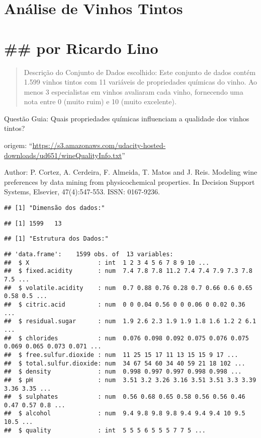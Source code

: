 \documentclass[]{article}
\title{}
\author{}
\date{}
\begin{document}
\hypertarget{analise-de-vinhos-tintos}{%
\section{Análise de Vinhos Tintos}\label{analise-de-vinhos-tintos}}

\hypertarget{por-ricardo-lino}{%
\section{\#\# por Ricardo Lino}\label{por-ricardo-lino}}

\begin{quote}
Descrição do Conjunto de Dados escolhido: Este conjunto de dados contém
1.599 vinhos tintos com 11 variáveis de propriedades químicas do vinho.
Ao menos 3 especialistas em vinhos avaliaram cada vinho, fornecendo uma
nota entre 0 (muito ruim) e 10 (muito excelente).
\end{quote}

Questão Guia: Quais propriedades químicas influenciam a qualidade dos
vinhos tintos?

origem:
``\url{https://s3.amazonaws.com/udacity-hosted-downloads/ud651/wineQualityInfo.txt}''

Author: P. Cortez, A. Cerdeira, F. Almeida, T. Matos and J. Reis.
Modeling wine preferences by data mining from physicochemical
properties. In Decision Support Systems, Elsevier, 47(4):547-553. ISSN:
0167-9236.

\begin{verbatim}
## [1] "Dimensão dos dados:"
\end{verbatim}

\begin{verbatim}
## [1] 1599   13
\end{verbatim}

\begin{verbatim}
## [1] "Estrutura dos Dados:"
\end{verbatim}

\begin{verbatim}
## 'data.frame':    1599 obs. of  13 variables:
##  $ X                   : int  1 2 3 4 5 6 7 8 9 10 ...
##  $ fixed.acidity       : num  7.4 7.8 7.8 11.2 7.4 7.4 7.9 7.3 7.8 7.5 ...
##  $ volatile.acidity    : num  0.7 0.88 0.76 0.28 0.7 0.66 0.6 0.65 0.58 0.5 ...
##  $ citric.acid         : num  0 0 0.04 0.56 0 0 0.06 0 0.02 0.36 ...
##  $ residual.sugar      : num  1.9 2.6 2.3 1.9 1.9 1.8 1.6 1.2 2 6.1 ...
##  $ chlorides           : num  0.076 0.098 0.092 0.075 0.076 0.075 0.069 0.065 0.073 0.071 ...
##  $ free.sulfur.dioxide : num  11 25 15 17 11 13 15 15 9 17 ...
##  $ total.sulfur.dioxide: num  34 67 54 60 34 40 59 21 18 102 ...
##  $ density             : num  0.998 0.997 0.997 0.998 0.998 ...
##  $ pH                  : num  3.51 3.2 3.26 3.16 3.51 3.51 3.3 3.39 3.36 3.35 ...
##  $ sulphates           : num  0.56 0.68 0.65 0.58 0.56 0.56 0.46 0.47 0.57 0.8 ...
##  $ alcohol             : num  9.4 9.8 9.8 9.8 9.4 9.4 9.4 10 9.5 10.5 ...
##  $ quality             : int  5 5 5 6 5 5 5 7 7 5 ...
\end{verbatim}
\end{document}
